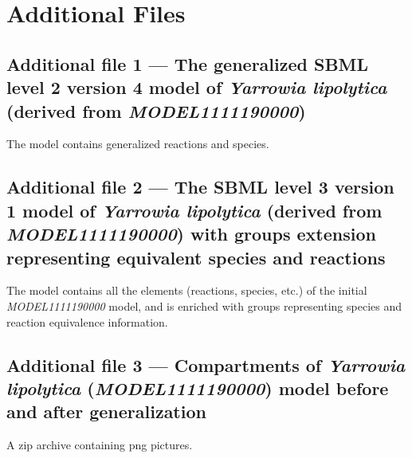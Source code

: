 \documentclass[9pt]{article}
\newcounter{fig}
\newcounter{rm}
\begin{document}
%
%      

\section*{Additional Files}
  \subsection*{Additional file 1 --- The generalized SBML level 2 version 4 model of \textit{Yarrowia lipolytica} (derived from \emph{MODEL1111190000})}
    The model contains generalized reactions and species.
    
  \subsection*{Additional file 2 --- The SBML level 3 version 1 model of \textit{Yarrowia lipolytica} (derived from \emph{MODEL1111190000}) with groups extension representing equivalent species and reactions}
    The model contains all the elements (reactions, species, etc.) of the initial \emph{MODEL1111190000} model, and is enriched with groups representing species and reaction equivalence information.
    
    \subsection*{Additional file 3 --- Compartments of \textit{Yarrowia lipolytica} (\emph{MODEL1111190000}) model before and after generalization}
    A zip archive containing png pictures.
    
\end{document}

